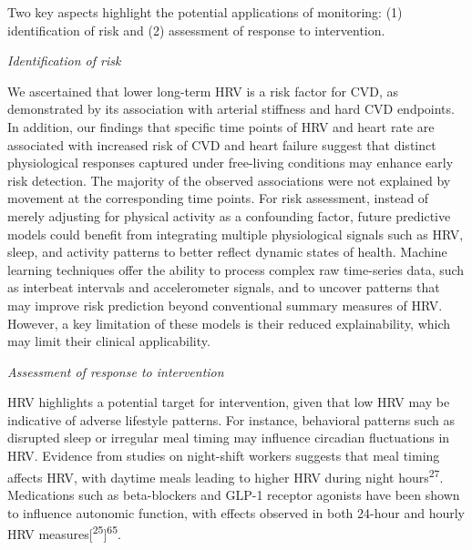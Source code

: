 \documentclass[
  a4paper,
  headsepline=true,
  open=any]{scrbook}
\begin{document}
Two key aspects highlight the potential applications of monitoring: (1)
identification of risk and (2) assessment of response to intervention.

\emph{Identification of risk}

We ascertained that lower long-term HRV is a risk factor for CVD, as
demonstrated by its association with arterial stiffness and hard CVD
endpoints. In addition, our findings that specific time points of HRV
and heart rate are associated with increased risk of CVD and heart
failure suggest that distinct physiological responses captured under
free-living conditions may enhance early risk detection. The majority of
the observed associations were not explained by movement at the
corresponding time points. For risk assessment, instead of merely
adjusting for physical activity as a confounding factor, future
predictive models could benefit from integrating multiple physiological
signals such as HRV, sleep, and activity patterns to better reflect
dynamic states of health. Machine learning techniques offer the ability
to process complex raw time-series data, such as interbeat intervals and
accelerometer signals, and to uncover patterns that may improve risk
prediction beyond conventional summary measures of HRV. However, a key
limitation of these models is their reduced explainability, which may
limit their clinical applicability.

\emph{Assessment of response to intervention}

HRV highlights a potential target for intervention, given that low HRV
may be indicative of adverse lifestyle patterns. For instance,
behavioral patterns such as disrupted sleep or irregular meal timing may
influence circadian fluctuations in HRV. Evidence from studies on
night-shift workers suggests that meal timing affects HRV, with daytime
meals leading to higher HRV during night hours\textsuperscript{27}.
Medications such as beta-blockers and GLP-1 receptor agonists have been
shown to influence autonomic function, with effects observed in both
24-hour and hourly HRV
measures{[}\textsuperscript{25}{]}\textsuperscript{65}.
\end{document}
